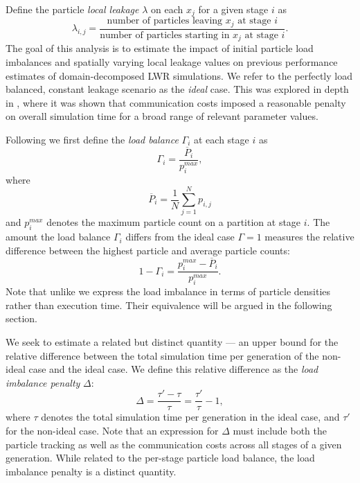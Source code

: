 Define the particle \textit{local leakage} $\lambda$ on each $x_j$ for a given
stage $i$ as
\begin{equation*}
  \lambda_{i,j} = \frac{\mbox{number of particles leaving $x_j$ at stage
      $i$}}{\mbox{number of particles starting in $x_j$ at stage $i$}}.
\end{equation*}
The goal of this analysis is to estimate the impact of initial particle load
imbalances and spatially varying local leakage values on previous performance
estimates of domain-decomposed LWR simulations.  We refer to the perfectly load
balanced, constant leakage scenario as the \emph{ideal} case. This was explored
in depth in \cite{jcp-siegel-2012-1}, where it was shown that communication
costs imposed a reasonable penalty on overall simulation time for a broad range
of relevant parameter values.

Following \cite{scott-2005} we first define the \emph{load balance} $\Gamma_i$
at each stage $i$ as
\begin{equation}
  \Gamma_i = \frac {\overline{P}_i}{p_i^{max}},
\end{equation}
where
\begin{equation*}
  \overline{P}_i = \frac{1}{N}\sum_{j=1}^{N} p_{i,j}
\end{equation*}
and $p_i^{max}$ denotes the maximum particle count on a partition at stage $i$.
The amount the load balance $\Gamma_i$ differs from the ideal case $\Gamma = 1$
measures the relative difference between the highest particle and average
particle counts:
\begin{equation}
  1- \Gamma_i = \frac{p_i^{max} - \overline{P}_i}{p_i^{max}}.
\end{equation}
Note that unlike \cite{scott-2005} we express the load imbalance in terms of
particle densities rather than execution time. Their equivalence will be argued
in the following section.

We seek to estimate a related but distinct quantity --- an upper bound for the
relative difference between the total simulation time per generation of the
non-ideal case and the ideal case. We define this relative difference as the
\textit{load imbalance penalty} $\Delta$:
\begin{equation}
  \label{eq:load-imbalance}
  \Delta = \frac{\tau' - \tau}{\tau} = \frac{\tau'}{\tau} - 1,
\end{equation}
where $\tau$ denotes the total simulation time per generation in the ideal case,
and $\tau'$ for the non-ideal case.  Note that an expression for $\Delta$ must
include both the particle tracking as well as the communication costs across all
stages of a given generation. While related to the per-stage particle load
balance, the load imbalance penalty is a distinct quantity.

